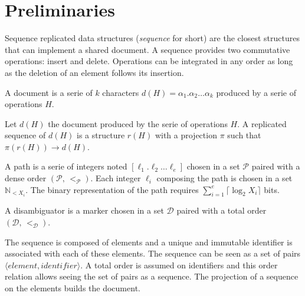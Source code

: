 
\section{Preliminaries}
\label{sec:preliminaries}

Sequence replicated data structures (\emph{sequence} for short) are the closest
structures that can implement a shared document. A sequence provides two
commutative operations: insert and delete. Operations can be integrated in any
order as long as the deletion of an element follows its insertion.


\begin{definition}[Document]
  A document is a serie of $k$ characters
  $d(H) = \alpha_1.\alpha_2\ldots \alpha_k$ produced by a serie of operations
  $H$.
\end{definition}

\begin{definition}
  Let $d(H)$ the document produced by the serie of operations $H$. A replicated
  sequence of $d(H)$ is a structure $r(H)$ with a projection $\pi$ such that
  $\pi(r(H)) \rightarrow d(H)$.
\end{definition}

\begin{definition}[Path]
  A path is a serie of integers noted $[\ell_1.\ell_2\ldots \ell_e]$ chosen in a
  set $\mathcal{P}$ paired with a dense order $(\mathcal{P},\, <_\mathcal{P})$.
  Each integer $\ell_i$ composing the path is chosen in a set
  $\mathbb{N}_{<X_i}$. The binary representation of the path requires
  $\textstyle \sum\nolimits_{i=1}^e \lceil \log_2 X_i\rceil$ bits.
\end{definition}

\begin{definition}[Disambiguator]
  A disambiguator is a marker chosen in a set $\mathcal{D}$ paired with a total
  order $(\mathcal{D},\, <_\mathcal{D})$.
\end{definition}

The sequence is composed of elements and a unique and immutable identifier is
associated with each of these elements. The sequence can be seen as a set of
pairs $\langle element, identifier \rangle$. A total order is assumed on
identifiers and this order relation allows seeing the set of pairs as a
sequence. The projection of a sequence on the elements builds the document.

